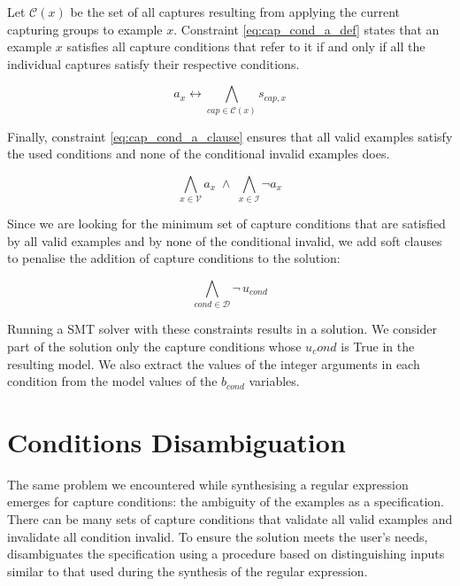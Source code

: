 Let \(\mathcal{C}(x)\) be the set of all captures resulting from applying the current capturing groups to example \(x\). Constraint \ref{eq:cap_cond_a_def} states that an example \(x\) satisfies all capture conditions that refer to it if and only if all the individual captures satisfy their respective conditions.

\begin{equation}\label{eq:cap_cond_a_def}
    a_x \leftrightarrow \bigwedge_{cap \in \mathcal{C}(x)} s_{cap,x}
\end{equation}

Finally, constraint \ref{eq:cap_cond_a_clause} ensures that all valid examples satisfy the used conditions and none of the conditional invalid examples does.

\begin{equation}\label{eq:cap_cond_a_clause}
    \bigwedge_{x \in \mathcal{V}} a_x \;\land\; \bigwedge_{x \in \mathcal{I}} \neg a_x
\end{equation}


Since we are looking for the minimum set of capture conditions that are satisfied by all valid examples and by none of the conditional invalid, we add soft clauses to penalise the addition of capture conditions to the solution:

\begin{equation}
    \bigwedge_{cond \in \mathcal{D}} \neg\, u_{cond}
\end{equation}

Running a \ac{SMT} solver with these constraints results in a solution. We consider part of the solution only the capture conditions whose \(u_cond\) is True in the resulting model. We also extract the values of the integer arguments in each condition from the model values of the \(b_{\textit{cond}}\) variables.

\section{Conditions Disambiguation}
\label{sec:cap_cond_distinguish}

The same problem we encountered while synthesising a regular expression emerges for capture conditions: the ambiguity of the examples as a specification. There can be many sets of capture conditions that validate all valid examples and invalidate all condition invalid. To ensure the solution meets the user's needs, \Forest disambiguates the specification using a procedure based on distinguishing inputs similar to that used during the synthesis of the regular expression.

